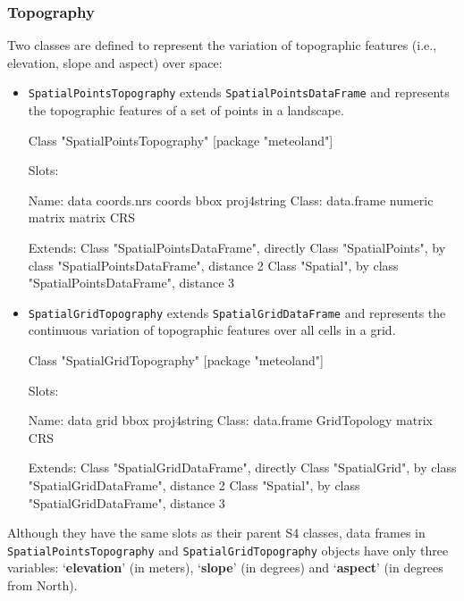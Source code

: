 \documentclass[11pt,a4paper]{article}
\begin{document}
\subsubsection{Topography}
Two classes are defined to represent the variation of topographic features (i.e., elevation, slope and aspect) over space:
\begin{itemize}
\item{\texttt{SpatialPointsTopography} extends \texttt{SpatialPointsDataFrame} and represents the topographic features of a set of points in a landscape.
\begin{Schunk}
\begin{Soutput}
Class "SpatialPointsTopography" [package "meteoland"]

Slots:
                                                                  
Name:         data  coords.nrs      coords        bbox proj4string
Class:  data.frame     numeric      matrix      matrix         CRS

Extends: 
Class "SpatialPointsDataFrame", directly
Class "SpatialPoints", by class "SpatialPointsDataFrame", distance 2
Class "Spatial", by class "SpatialPointsDataFrame", distance 3
\end{Soutput}
\end{Schunk}
}
\item{\texttt{SpatialGridTopography} extends \texttt{SpatialGridDataFrame} and represents the continuous variation of topographic features over all cells in a grid.
\begin{Schunk}
\begin{Soutput}
Class "SpatialGridTopography" [package "meteoland"]

Slots:
                                                          
Name:          data         grid         bbox  proj4string
Class:   data.frame GridTopology       matrix          CRS

Extends: 
Class "SpatialGridDataFrame", directly
Class "SpatialGrid", by class "SpatialGridDataFrame", distance 2
Class "Spatial", by class "SpatialGridDataFrame", distance 3
\end{Soutput}
\end{Schunk}
}
\end{itemize}
Although they have the same slots as their parent S4 classes, data frames in \texttt{SpatialPointsTopography} and \texttt{SpatialGridTopography} objects have only three variables: `\textbf{elevation}' (in meters), `\textbf{slope}' (in degrees) and `\textbf{aspect}' (in degrees from North).
\end{document}
